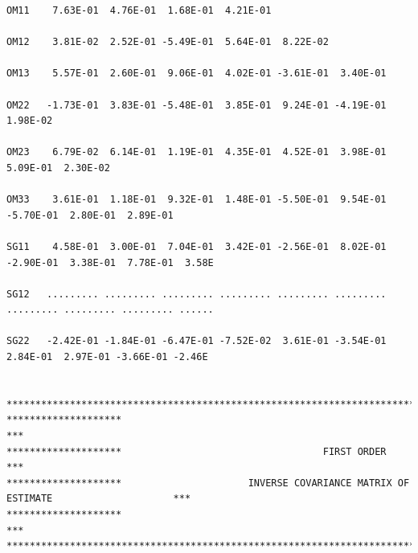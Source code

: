 \documentclass[
  10pt,
]{krantz}
\begin{document}
\begin{verbatim}
OM11    7.63E-01  4.76E-01  1.68E-01  4.21E-01                                                         
                                                                                                       
OM12    3.81E-02  2.52E-01 -5.49E-01  5.64E-01  8.22E-02                                               
                                                                                                       
OM13    5.57E-01  2.60E-01  9.06E-01  4.02E-01 -3.61E-01  3.40E-01                                     
                                                                                                       
OM22   -1.73E-01  3.83E-01 -5.48E-01  3.85E-01  9.24E-01 -4.19E-01  1.98E-02                           
                                                                                                       
OM23    6.79E-02  6.14E-01  1.19E-01  4.35E-01  4.52E-01  3.98E-01  5.09E-01  2.30E-02                 
                                                                                                       
OM33    3.61E-01  1.18E-01  9.32E-01  1.48E-01 -5.50E-01  9.54E-01 -5.70E-01  2.80E-01  2.89E-01       
                                                                                                       
SG11    4.58E-01  3.00E-01  7.04E-01  3.42E-01 -2.56E-01  8.02E-01 -2.90E-01  3.38E-01  7.78E-01  3.58E
                                                                                                       
SG12   ......... ......... ......... ......... ......... ......... ......... ......... ......... ......
                                                                                                       
SG22   -2.42E-01 -1.84E-01 -6.47E-01 -7.52E-02  3.61E-01 -3.54E-01  2.84E-01  2.97E-01 -3.66E-01 -2.46E
                                                                                                       
                                                                                                       
*******************************************************************************************************
********************                                                                                ***
********************                                   FIRST ORDER                                  ***
********************                      INVERSE COVARIANCE MATRIX OF ESTIMATE                     ***
********************                                                                                ***
*******************************************************************************************************
                                                                                                       

\end{verbatim}
\end{document}
